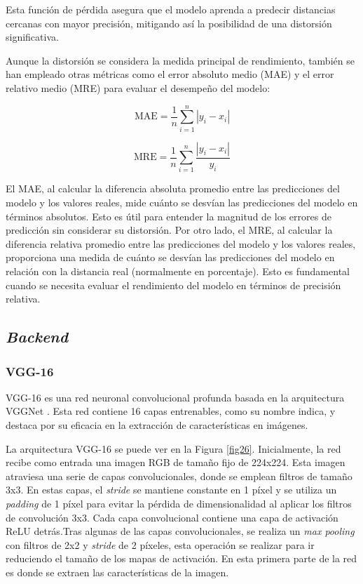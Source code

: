 Esta función de pérdida asegura que el modelo aprenda a predecir distancias cercanas con mayor precisión, mitigando así la posibilidad de una distorsión significativa.

Aunque la distorsión se considera la medida principal de rendimiento, también se han empleado otras métricas como el error absoluto medio (MAE) y el error relativo medio (MRE) para evaluar el desempeño del modelo:

\begin{equation}
	\text{MAE} = \frac{1}{n} \sum_{i=1}^{n} | y_i - x_i |
\end{equation}

\begin{equation}
	\text{MRE} = \frac{1}{n} \sum_{i=1}^{n} \frac{| y_i - x_i |}{y_i}
\end{equation}

El MAE, al calcular la diferencia absoluta promedio entre las predicciones del modelo y los valores reales, mide cuánto se desvían las predicciones del modelo en términos absolutos. Esto es útil para entender la magnitud de los errores de predicción sin considerar su distorsión.
Por otro lado, el MRE, al calcular la diferencia relativa promedio entre las predicciones del modelo y los valores reales, proporciona una medida de cuánto se desvían las predicciones del modelo en relación con la distancia real (normalmente en porcentaje). Esto es fundamental cuando se necesita evaluar el rendimiento del modelo en términos de precisión relativa.

\subsection{\textit{Backend}}\label{backend}

\subsubsection{VGG-16}\label{vgg16}

VGG-16 es una red neuronal convolucional profunda basada en la arquitectura VGGNet \cite{65}. Esta red contiene 16 capas entrenables, como su nombre indica, y destaca por su eficacia en la extracción de características en imágenes.

La arquitectura VGG-16 se puede ver en la Figura \ref{fig26}. Inicialmente, la red recibe como entrada una imagen RGB de tamaño fijo de 224x224. Esta imagen atraviesa una serie de capas convolucionales, donde se emplean filtros de tamaño 3x3. En estas capas, el \textit{stride} se mantiene constante en 1 píxel y se utiliza un \textit{padding} de 1 píxel para evitar la pérdida de dimensionalidad al aplicar los filtros de convolución 3x3. Cada capa convolucional contiene una capa de activación ReLU detrás.Tras algunas de las capas convolucionales, se realiza un \textit{max pooling} con filtros de 2x2 y \textit{stride} de 2 píxeles, esta operación se realizar para ir reduciendo el tamaño de los mapas de activación. En esta primera parte de la red es donde se extraen las características de la imagen.

